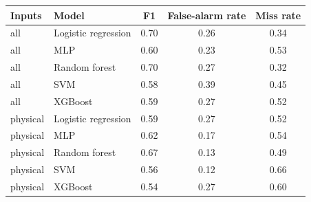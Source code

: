 \begin{tabular}{llccc}
\toprule
Inputs & Model & F1 & False-alarm rate & Miss rate \\
\midrule
all & Logistic regression & 0.70 & 0.26 & 0.34 \\
all & MLP & 0.60 & 0.23 & 0.53 \\
all & Random forest & 0.70 & 0.27 & 0.32 \\
all & SVM & 0.58 & 0.39 & 0.45 \\
all & XGBoost & 0.59 & 0.27 & 0.52 \\
physical & Logistic regression & 0.59 & 0.27 & 0.52 \\
physical & MLP & 0.62 & 0.17 & 0.54 \\
physical & Random forest & 0.67 & 0.13 & 0.49 \\
physical & SVM & 0.56 & 0.12 & 0.66 \\
physical & XGBoost & 0.54 & 0.27 & 0.60 \\
\bottomrule
\end{tabular}

